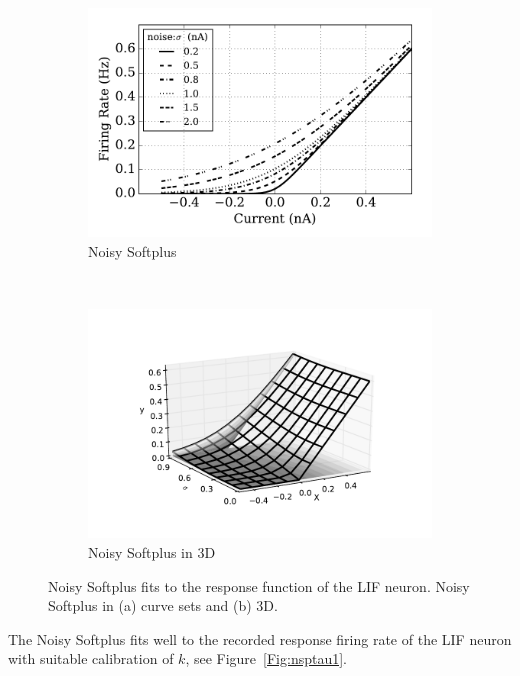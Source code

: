 	\begin{figure}[htb!]
		\centering
		\begin{subfigure}[t]{0.6\textwidth}
			\includegraphics[width=\textwidth]{pics_iconip/4.pdf}
			\caption{Noisy Softplus}
			\label{Fig:nsp}
		\end{subfigure}\\
		\begin{subfigure}[t]{0.6\textwidth}
			\includegraphics[width=\textwidth]{pics_iconip/5.pdf}
			\caption{Noisy Softplus in 3D}
			\label{Fig:3d}
		\end{subfigure}
		\caption{
			Noisy Softplus fits to the response function of the LIF neuron.
			Noisy Softplus in (a) curve sets and (b) 3D.}
		\label{fig:nsp}
	\end{figure}	
	
	
	The Noisy Softplus fits well to the recorded response firing rate of the LIF neuron with suitable calibration of $k$, see Figure~\ref{Fig:nsptau1}.
	
